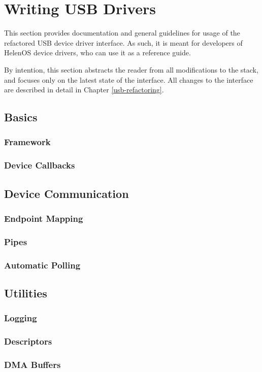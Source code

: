\chapter{Writing USB Drivers}

This section provides documentation and general guidelines for usage of the
refactored USB device driver interface. As such, it is meant for developers of
HelenOS device drivers, who can use it as a reference guide.

By intention, this section abstracts the reader from all modifications to the
stack, and focuses only on the latest state of the interface. All changes to the
interface are described in detail in Chapter \ref{usb-refactoring}.


\section{Basics}

\subsection{Framework}

\subsection{Device Callbacks}


\section{Device Communication}

\subsection{Endpoint Mapping}

\subsection{Pipes}

\subsection{Automatic Polling}


\section{Utilities}

\subsection{Logging}

\subsection{Descriptors}

\subsection{DMA Buffers}


